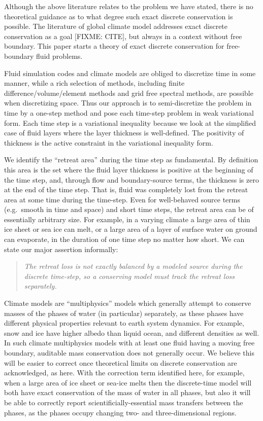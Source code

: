 \documentclass[final,leqno,onefignum,onetabnum]{siamltex1213bueler}
\begin{document}
Although the above literature relates to the problem we have stated, there is no theoretical guidance as to what degree such exact discrete conservation is possible.  The literature of global climate model addresses exact discrete conservation as a goal [FIXME: CITE], but always in a context without free boundary.  This paper starts a theory of exact discrete conservation for free-boundary fluid problems.

Fluid simulation codes and climate models are obliged to discretize time in some manner, while a rich selection of methods, including finite difference/volume/element methods and grid free spectral methods, are possible when discretizing space.  Thus our approach is to semi-discretize the problem in time by a one-step method and pose each time-step problem in weak variational form.  Each time step is a variational inequality because we look at the simplified case of fluid layers where the layer thickness is well-defined.  The positivity of thickness is the active constraint in the variational inequality form.

We identify the ``retreat area'' during the time step as fundamental.  By definition this area is the set where the fluid layer thickness is positive at the beginning of the time step, and, through flow and boundary-source terms, the thickness is zero at the end of the time step.  That is, fluid was completely lost from the retreat area at some time during the time-step.  Even for well-behaved source terms (e.g.~smooth in time and space) and short time steps, the retreat area can be of essentially arbitrary size.  For example, in a varying climate a large area of thin ice sheet or sea ice can melt, or a large area of a layer of surface water on ground can evaporate, in the duration of one time step no matter how short.  We can state our major assertion informally:
\begin{quote}
\emph{The retreat loss is not exactly balanced by a \emph{modeled} source during the discrete time-step, so a conserving model must track the retreat loss separately.}
\end{quote}

Climate models are ``multiphysics'' models which generally attempt to conserve masses of the phases of water (in particular) separately, as these phases have different physical properties relevant to earth system dynamics.  For example, snow and ice have higher albedo than liquid ocean, and different densities as well.  In such climate multiphysics models with at least one fluid having a moving free boundary, auditable mass conservation does not generally occur.  We believe this will be easier to correct once theoretical limits on discrete conservation are acknowledged, as here.  With the correction term identified here, for example, when a large area of ice sheet or sea-ice melts then the discrete-time model will both have exact conservation of the mass of water in all phases, but also it will be able to correctly report scientificially-essential mass transfers between the phases, as the phases occupy changing two- and three-dimensional regions.
\end{document}
